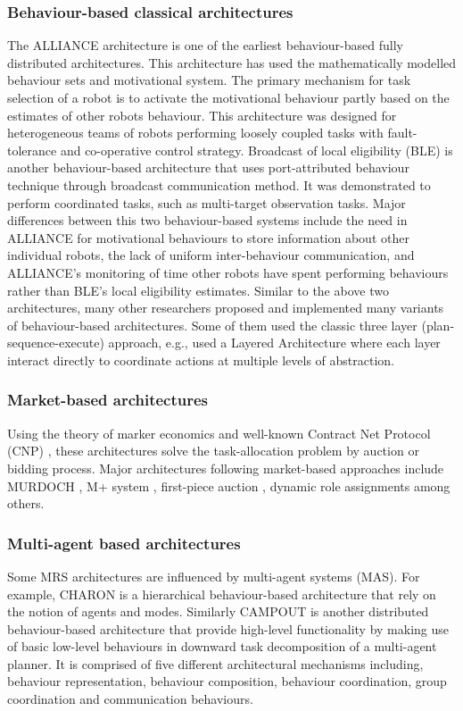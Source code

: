 \subsubsection*{Behaviour-based classical architectures}
The ALLIANCE architecture \cite{Parker1998} is one of the earliest behaviour-based fully distributed architectures. This architecture has used the mathematically modelled behaviour sets and motivational system. The primary mechanism for task selection of a robot is to activate the motivational behaviour partly based on the estimates of other robots behaviour. This architecture was designed for heterogeneous teams of robots performing loosely coupled tasks with fault-tolerance and co-operative control strategy. Broadcast of local eligibility (BLE) \cite{Werger2001} is another behaviour-based architecture that uses port-attributed behaviour technique through broadcast communication method. It was demonstrated to perform coordinated tasks, such as multi-target observation tasks. Major differences between this two behaviour-based systems include the need in ALLIANCE for motivational behaviours to store information about other individual robots, the lack of uniform inter-behaviour communication, and ALLIANCE's monitoring of time other robots have spent performing behaviours rather than BLE's local eligibility estimates. Similar to the above two architectures, many other researchers proposed and implemented many variants of behaviour-based architectures. Some of them used the classic three layer (plan-sequence-execute) approach, e.g., \cite{Simmons+2002} used a Layered Architecture where each layer interact directly to coordinate actions at multiple levels of abstraction. 
\subsubsection*{Market-based architectures}
Using the theory of marker economics and well-known Contract Net Protocol (CNP) \cite{Davis1988+}, these architectures solve the task-allocation problem by auction or bidding process. Major architectures following market-based approaches include MURDOCH \cite{Gerkey+2002}, M+ system \cite{Botelho+1999}, first-piece auction \cite{Zlot+2002}, dynamic role assignments \cite{Chaimowicz2002} among others. 
\subsubsection*{Multi-agent based architectures}
Some MRS architectures are influenced by multi-agent systems (MAS). For example, CHARON is a hierarchical behaviour-based architecture that rely on the notion of agents and modes. Similarly CAMPOUT is another distributed behaviour-based architecture that provide high-level functionality by making use of basic low-level behaviours in downward task decomposition of a multi-agent planner. It is comprised of five different architectural mechanisms including, behaviour representation, behaviour composition, behaviour coordination, group coordination and communication behaviours.

